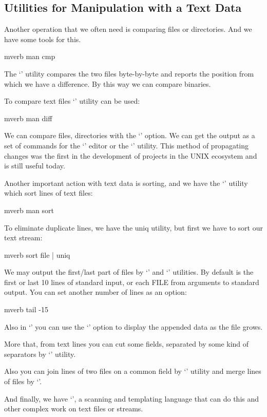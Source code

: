\subsection*{Utilities for Manipulation with a Text Data}

Another operation that we often need is comparing files or directories.
And we have some tools for this.
\begin{code}{mverb}
man cmp
\end{code}
The `' utility compares the two files byte-by-byte and reports
the position from which we have a difference. By this way we can compare
binaries.

To compare text files `' utility can be used:
\begin{code}{mverb}
man diff
\end{code}
We can compare files, directories with the `' option.
We can get the output as a set of commands for the `' editor or
the `' utility. This method of propagating changes was the first
in the development of projects in the UNIX ecosystem and is still useful today.

Another important action with text data is sorting, and we have
the `' utility which sort lines of text files:
\begin{code}{mverb}
man sort
\end{code}
To eliminate duplicate lines, we have the uniq utility, but first we have
to sort our text stream:
\begin{code}{mverb}
sort file | uniq
\end{code}

We may output the first/last part of files by `' and `'
utilities. By default is the first or last 10 lines of standard input, or
each FILE from arguments to standard output. You can set another number
of lines as an option:
\begin{code}{mverb}
tail -15
\end{code}
Also in `' you can use the `' option to display
the appended data as the file grows.

More that, from text lines you can cut some fields, separated by some
kind of separators by `' utility.

Also you can join lines of two files on a common field by `' utility
and merge lines of files by `'.

And finally, we have `', a scanning and templating language that can
do this and other complex work on text files or streams.
